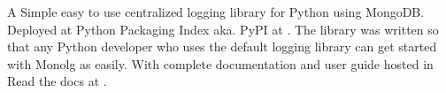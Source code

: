 
A Simple easy to use centralized logging library for Python using MongoDB. Deployed at Python Packaging Index aka. PyPI at \href{https://pypi.org/project/monolg/}{}. The library was written so that any Python developer who uses the default logging library can get started with Monolg as easily. With complete documentation and user guide hosted in Read the docs at \href{https://monolg.readthedocs.io/en/latest/}{}.


\href{https://github.com/Mukhopadhyay/monolg}{}

